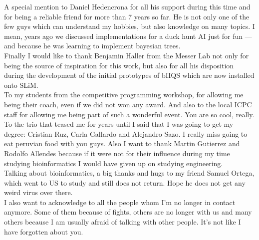 \begin{acknowledgment}
A special mention to Daniel Hedencrona for all his support during this time and for being a reliable friend for more than 7 years so far. He is not only one of the few guys which can understand my hobbies, but also knowledge on many topics. I mean, years ago we discussed implementations for a duck hunt AI just for fun --- and because he was learning to implement bayesian trees.\\

Finally I would like to thank Benjamin Haller from the Messer Lab not only for being the source of inspiration for this work, but also for all his disposition during the development of the initial prototypes of bIIQS which are now installed onto SLiM. \\

To my students from the competitive programming workshop, for allowing me being their coach, even if we did not won any award. And also to the local ICPC staff for allowing me being part of such a wonderful event. You are so cool, really.\\

To the trio that teased me for years until I said that I was going to get my degree: Cristian Ruz, Carla Gallardo and Alejandro Sazo. I really miss going to eat peruvian food with you guys. Also I want to thank Martin Gutierrez and Rodolfo Allendes because if it were not for their influence during my time studying bioinformatics I would have given up on studying engineering.\\

Talking about bioinformatics, a big thanks and hugs to my friend Samuel Ortega, which went to US to study and still does not return. Hope he does not get any weird virus over there.\\

I also want to acknowledge to all the people whom I'm no longer in contact anymore. Some of them because of fights, others are no longer with us and many others because I am usually afraid of talking with other people. It's not like I have forgotten about you.\\
\end{acknowledgment}